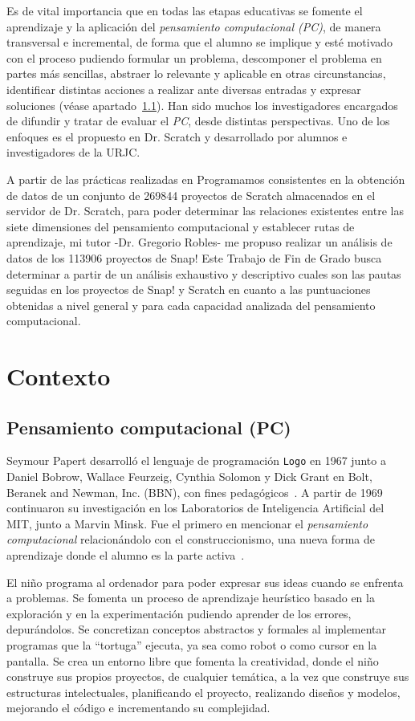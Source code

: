 \documentclass[a4paper, 12pt]{book}
\begin{document}
Es de vital importancia que en todas las etapas educativas se fomente el aprendizaje y la aplicación del \textit{pensamiento computacional (PC)}, 
de manera transversal e incremental, de forma que el alumno se implique y esté motivado con el proceso pudiendo formular un problema, descomponer el problema en partes más sencillas, abstraer lo relevante y aplicable en otras circunstancias, identificar distintas acciones a realizar ante diversas entradas y expresar soluciones (véase apartado~\ref{subsec:pc}). Han sido muchos los investigadores encargados de difundir y tratar de evaluar el \textit{PC}, desde distintas perspectivas. Uno de los enfoques es el propuesto en Dr. Scratch y desarrollado por alumnos e investigadores de la URJC.

A partir de las prácticas realizadas en Programamos consistentes en la obtención de datos de un conjunto de 269844 proyectos de Scratch almacenados en el servidor de Dr. Scratch, para poder determinar las relaciones existentes entre las siete dimensiones del pensamiento computacional y establecer rutas de aprendizaje, mi tutor -Dr. Gregorio Robles- me propuso realizar un análisis de datos de los 113906 proyectos de Snap! Este Trabajo de Fin de Grado busca determinar a partir de un análisis exhaustivo y descriptivo cuales son las pautas seguidas en los proyectos de Snap! y Scratch en cuanto a las puntuaciones obtenidas a nivel general y para cada capacidad analizada del pensamiento computacional. 

\section{Contexto}
\label{sec:contexto}

\subsection{Pensamiento computacional (PC)}
\label{subsec:pc}
Seymour Papert desarrolló el lenguaje de programación \texttt{Logo} en 1967 junto a Daniel Bobrow, Wallace Feurzeig, Cynthia Solomon y Dick Grant en Bolt, Beranek and Newman, Inc. (BBN), con fines pedagógicos~\cite{solomon20:_history}. A partir de 1969 continuaron su investigación en los Laboratorios de Inteligencia Artificial del MIT, junto a Marvin Minsk. Fue el primero en mencionar el \emph{pensamiento computacional} relacionándolo con el construccionismo, una nueva forma de aprendizaje donde el alumno es la parte activa~\cite{papert80:_mindstorm}.

El niño programa al ordenador para poder expresar sus ideas cuando se enfrenta a problemas. Se fomenta un proceso de aprendizaje heurístico basado en la exploración y en la experimentación pudiendo aprender de los errores, depurándolos. Se concretizan conceptos abstractos y formales al implementar programas que la ``tortuga'' ejecuta, ya sea como robot o como cursor en la pantalla. Se crea un entorno libre que fomenta la creatividad, donde el niño construye sus propios proyectos, de cualquier temática, a la vez que construye sus estructuras intelectuales, planificando el proyecto, realizando diseños y modelos, mejorando el código e incrementando su complejidad.
\end{document}
